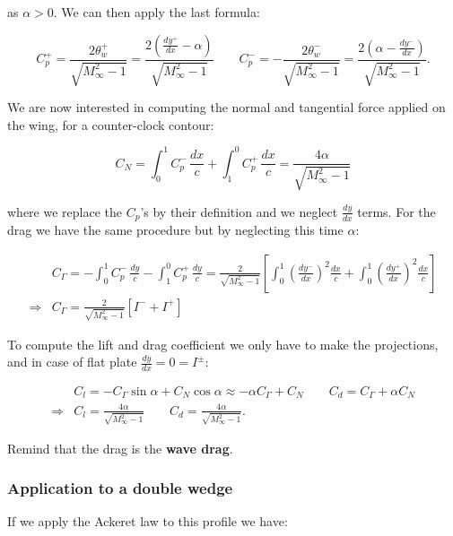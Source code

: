 	as $\alpha > 0$. We can then apply the last formula: 
	
	\begin{equation}
	C_p^+ = \frac{2\theta_w^+}{\sqrt{M^2_\infty - 1}} = \frac{2\left( \frac{dy^+}{dx} -\alpha \right)}{\sqrt{M^2_\infty - 1}} \qquad C_p^- = -\frac{2\theta_w^-}{\sqrt{M^2_\infty - 1}} = \frac{2\left( \alpha -\frac{dy^-}{dx}\right)}{\sqrt{M^2_\infty - 1}}.
	\end{equation}
	
	We are now interested in computing the normal and tangential force applied on the wing, for a counter-clock contour: 
	
	\begin{equation}
	C_N = \int _0 ^1 C_p ^- \, \frac{dx}{c} + \int _1 ^0 C_p ^+ \, \frac{dx}{c} = \frac{4\alpha }{\sqrt{M_\infty ^2-1}}
	\end{equation}
	
	where we replace the $C_p$'s by their definition and we neglect $\frac{dy}{dx}$ terms. For the drag we have the same procedure but by neglecting this time $\alpha$:
	
	\begin{equation}
	\begin{aligned}
	&C_\Gamma = -\int _0 ^1 C_p ^- \, \frac{dy}{c} - \int _1 ^0 C_p ^+ \, \frac{dy}{c} = \frac{2}{\sqrt{M_\infty ^2-1}} \left[ \int _0^1 \left(\frac{dy^-}{dx} \right)^2 \frac{dx}{c} + \int _0^1 \left(\frac{dy^+}{dx} \right)^2 \frac{dx}{c} \right]\\
	\Rightarrow &C_\Gamma =  \frac{2}{\sqrt{M_\infty ^2-1}} [I^- + I^+]
	\end{aligned}
	\end{equation}
	
	To compute the lift and drag coefficient we only have to make the projections, and in case of flat plate $\frac{dy}{dx} = 0 = I^\pm$: 
	
	\begin{equation}
	\begin{aligned}
	&C_l = -C_\Gamma \sin \alpha + C_N \cos \alpha \approx -\alpha C_\Gamma  + C_N \qquad C_d = C_\Gamma  + \alpha C_N\\
	\Rightarrow &C_l = \frac{4\alpha}{\sqrt{M_\infty ^2 -1}} \qquad C_d = \frac{4\alpha}{\sqrt{M_\infty ^2 -1}}.
		\end{aligned}
	\end{equation}
	
	Remind that the drag is the \textbf{wave drag}. 
	
\subsubsection{Application to a double wedge}
	If we apply the Ackeret law to this profile we have:
	
